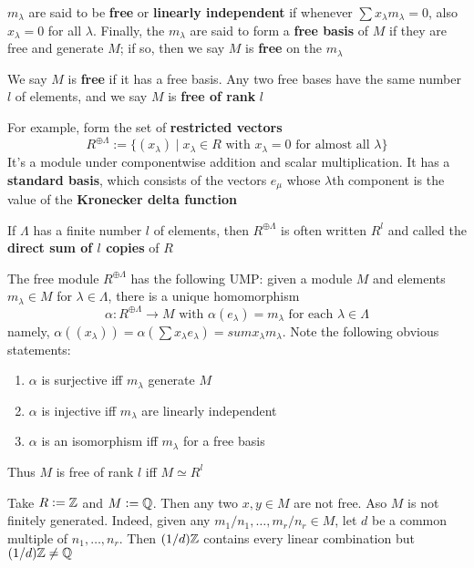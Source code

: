 \documentclass[11pt]{article}
\begin{document}
\(m_\lambda\) are said to be \textbf{free} or \textbf{linearly independent} if whenever \(\sum
   x_\lambda m_\lambda=0\), also \(x_\lambda=0\) for all \(\lambda\). Finally, the
\(m_\lambda\) are said to form a \textbf{free basis} of \(M\) if they are free and
generate \(M\); if so, then we say \(M\) is \textbf{free} on the \(m_\lambda\)

We say \(M\) is \textbf{free} if it has a free basis. Any two free bases have the same
number \(l\) of elements, and we say \(M\) is \textbf{free of rank} \(l\)

For example, form the set of \textbf{restricted vectors}
\begin{equation*}
R^{\oplus\Lambda}:=\{(x_\lambda)\mid x_\lambda\in R\text{ with }x_\lambda=0
\text{ for almost all }\lambda\}
\end{equation*}
It's a module under componentwise addition and scalar multiplication. It has
a \textbf{standard basis}, which consists of the vectors \(e_\mu\) whose \(\lambda\)th
component is the value of the \textbf{Kronecker delta function}

If \(\Lambda\) has a finite number \(l\) of elements, then \(R^{\oplus\Lambda}\) is
often written \(R^l\) and called the \textbf{direct sum of \(l\) copies} of \(R\)

The free module \(R^{\oplus\Lambda}\) has the following UMP: given a module
\(M\) and elements \(m_\lambda\in M\) for \(\lambda\in\Lambda\), there is a
unique homomorphism
\begin{equation*}
\alpha:R^{\oplus\Lambda}\to M\text{ with }\alpha(e_\lambda)=m_\lambda
\text{ for each }\lambda\in\Lambda
\end{equation*}
namely, \(\alpha((x_\lambda))=\alpha(\sum x_\lambda e_\lambda)=sum x_\lambda
   m_\lambda\). Note the following obvious statements:
\begin{enumerate}
\item \(\alpha\) is surjective iff \(m_\lambda\) generate \(M\)
\item \(\alpha\) is injective iff \(m_\lambda\) are linearly independent
\item \(\alpha\) is an isomorphism iff \(m_\lambda\) for a free basis
\end{enumerate}


Thus \(M\) is free of rank \(l\) iff \(M\simeq R^l\)

\begin{exercise}
\label{4.12}
Take \(R:=\mathbb{Z}\) and \(M:=\mathbb{Q}\). Then any two \(x,y\in M\) are not free. Aso \(M\)
is not finitely generated. Indeed, given any \(m_1/n_1,\dots,m_r/n_r\in M\),
let \(d\) be a common multiple of \(n_1,\dots,n_r\). Then \((1/d)\mathbb{Z}\)
contains every linear combination but \((1/d)\mathbb{Z}\neq\mathbb{Q}\)
\end{exercise}
\end{document}
